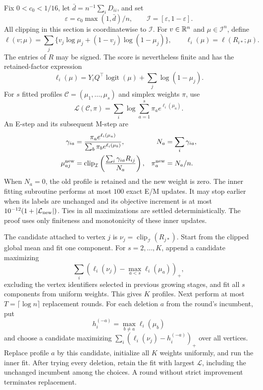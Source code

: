 Fix $0<c_0<1/16$, let $\bar d=n^{-1}\sum_iD_{ii}$, and set
\[
 \varepsilon=c_0\max(1,\bar d)/n,\qquad
 \mathcal I=[\varepsilon,1-\varepsilon].
\]
All clipping in this section is coordinatewise to $\mathcal I$.
For $v\in\mathbb R^n$ and $\mu\in\mathcal I^n$, define
\[
 \ell(v;\mu)
 =\sum_j\{v_j\log\mu_j+(1-v_j)\log(1-\mu_j)\},
 \qquad \ell_i(\mu)=\ell(R_{i*};\mu).
\]
The entries of $R$ may be signed. The score is nevertheless finite and
has the retained-factor expression
\begin{equation}
 \ell_i(\mu)=Y_iQ^\top\operatorname{logit}(\mu)
             +\sum_j\log(1-\mu_j).
 \label{sbm:score}
\end{equation}
For $s$ fitted profiles $\mathcal C=(\mu_1,\ldots,\mu_s)$ and simplex
weights $\pi$, use
\[
 \mathcal L(\mathcal C,\pi)
 =\sum_i\log\sum_{a=1}^s\pi_a e^{\ell_i(\mu_a)}.
\]
An E-step and its subsequent M-step are
\begin{align}
 \gamma_{ia}
 &=\frac{\pi_a e^{\ell_i(\mu_a)}}
         {\sum_b\pi_b e^{\ell_i(\mu_b)}},
 &N_a&=\sum_i\gamma_{ia},\notag\\
 \mu_{aj}^{\rm new}
 &=\operatorname{clip}_{\mathcal I}
       \left(\frac{\sum_i\gamma_{ia}R_{ij}}{N_a}\right),
 &\pi_a^{\rm new}&=N_a/n.
 \label{sbm:em}
\end{align}
When $N_a=0$, the old profile is retained and the new weight is zero.
The inner fitting subroutine performs at most $100$ exact E/M updates.
It may stop earlier when its labels are unchanged and its objective
increment is at most $10^{-12}(1+|\mathcal L_{\rm new}|)$. Ties in
all maximizations are settled deterministically. The proof uses only
finiteness and monotonicity of these inner updates.

The candidate attached to vertex $j$ is
$\nu_j=\operatorname{clip}_{\mathcal I}(R_{j*})$. Start from the clipped
global mean and fit one component. For $s=2,\ldots,K$, append a candidate
maximizing
\[
 \sum_i\left(\ell_i(\nu_j)-\max_{a<s}\ell_i(\mu_a)\right)_+,
\]
excluding the vertex identifiers selected in previous growing stages,
and fit all $s$ components from uniform weights. This gives $K$ profiles.
Next perform at most $T=\lceil\log n\rceil$ replacement rounds. For each
deletion $a$ from the round's incumbent, put
\[
 h_i^{(-a)}=\max_{b\ne a}\ell_i(\mu_b)
\]
and choose a candidate maximizing
$\sum_i(\ell_i(\nu_j)-h_i^{(-a)})_+$ over all vertices. Replace profile
$a$ by this candidate, initialize all $K$ weights uniformly, and run
the inner fit. After trying every deletion, retain the fit with largest
$\mathcal L$, including the unchanged incumbent among the choices.
A round without strict improvement terminates replacement.

